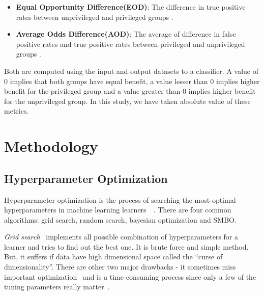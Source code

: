 \documentclass[10pt,conference]{IEEEtran}
\newcommand{\bi}{\begin{itemize}}
\newcommand{\ei}{\end{itemize}}
\begin{document}
\bi
\item \textbf{Equal Opportunity Difference(EOD)}: The difference in true positive rates between unprivileged and privileged groups \cite{IBM}. 
\item \textbf{Average Odds Difference(AOD)}: The average of difference in false positive rates and true positive rates between privileged and unprivileged groups \cite{IBM}.
\ei
Both are computed using the input and output datasets to a classifier. A value of 0 implies that both groups have equal benefit, a value lesser than 0 implies higher benefit for the privileged group and a value greater than 0 implies higher benefit for the unprivileged group. In this study, we have taken absolute value of these metrics. 

\section{Methodology}

\subsection{Hyperparameter Optimization}
 Hyperparameter optimization is the process of searching the most optimal hyperparameters in machine learning learners~\cite{biedenkapp2018hyperparameter}~\cite{franceschi2017forward}. There are four common algorithms: grid search, random search, bayesian optimization and SMBO.

\textit{Grid search}~\cite{bergstra2011algorithms} implements all possible combination of hyperparameters for a learner and tries to find out the best one. It is brute force and simple method. But, it suffers if data have high dimensional space called the ``curse of dimensionality''. There are other two major drawbacks - it sometimes miss important optimization~\cite{fu2016differential} and is a time-consuming process since only a few of the tuning parameters really matter~\cite{bergstra2012random}.
\end{document}
